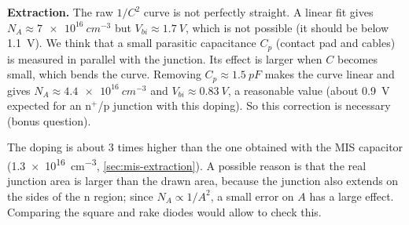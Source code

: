 \textbf{Extraction.} The raw $1/C^2$ curve is not perfectly straight. A linear fit gives
$N_A\approx\SI{7e16}{cm^{-3}}$ but $V_{bi}\approx\SI{1.7}{V}$, which is not possible (it should be
below \SI{1.1}{V}). We think that a small parasitic capacitance $C_p$ (contact pad and cables) is
measured in parallel with the junction. Its effect is larger when $C$ becomes small, which bends the
curve. Removing $C_p\approx\SI{1.5}{pF}$ makes the curve linear and gives
$N_A\approx\SI{4.4e16}{cm^{-3}}$ and $V_{bi}\approx\SI{0.83}{V}$, a reasonable value
(about \SI{0.9}{V} expected for an n$^+$/p junction with this doping). So this correction is
necessary (bonus question).

The doping is about 3 times higher than the one obtained with the MIS capacitor
(\SI{1.3e16}{cm^{-3}}, \cref{sec:mis-extraction}). A possible reason is that the real junction area
is larger than the drawn area, because the junction also extends on the sides of the n region;
since $N_A\propto1/A^2$, a small error on $A$ has a large effect. Comparing the square and rake
diodes would allow to check this.
